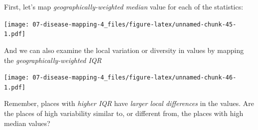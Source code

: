 \documentclass[
]{book}
\newenvironment{Shaded}{\begin{snugshade}}{\end{snugshade}}
\newcommand{\AttributeTok}[1]{\textcolor[rgb]{0.77,0.63,0.00}{#1}}
\newcommand{\CommentTok}[1]{\textcolor[rgb]{0.56,0.35,0.01}{\textit{#1}}}
\newcommand{\FunctionTok}[1]{\textcolor[rgb]{0.00,0.00,0.00}{#1}}
\newcommand{\NormalTok}[1]{#1}
\newcommand{\SpecialCharTok}[1]{\textcolor[rgb]{0.00,0.00,0.00}{#1}}
\newcommand{\StringTok}[1]{\textcolor[rgb]{0.31,0.60,0.02}{#1}}
\begin{document}
First, let's map \emph{geographically-weighted median} value for each of the statistics:

\begin{Shaded}
\end{Shaded}

\texttt{[image: 07-disease-mapping-4\_files/figure-latex/unnamed-chunk-45-1.pdf]}

And we can also examine the local variation or diversity in values by mapping the \emph{geographically-weighted IQR}

\begin{Shaded}
\end{Shaded}

\texttt{[image: 07-disease-mapping-4\_files/figure-latex/unnamed-chunk-46-1.pdf]}

Remember, places with \emph{higher IQR} have \emph{larger local differences} in the values. Are the places of high variability similar to, or different from, the places with high median values?
\end{document}
